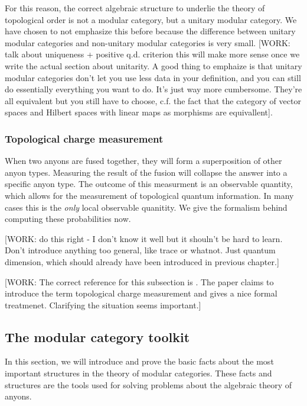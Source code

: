For this reason, the correct algebraic structure to underlie the theory of topological order is not a modular category, but a unitary modular category. We have chosen to not emphasize this before because the difference between unitary modular categories and non-unitary modular categories is very small. [WORK: talk about uniqueness + positive q.d. criterion this will make more sense once we write the actual section about unitarity. A good thing to emphaize is that unitary modular categories don't let you use less data in your definition, and you can still do essentially everything you want to do. It's just way more cumbersome. They're all equivalent but you still have to choose, c.f. the fact that the category of vector spaces and Hilbert spaces with linear maps as morphisms are equivallent].

\subsubsection{Topological charge measurement}

When two anyons are fused together, they will form a superposition of other anyon types. Measuring the result of the fusion will collapse the answer into a specific anyon type. The outcome of this measurment is an observable quantity, which allows for the measurement of topological quantum information. In many cases this is the \textit{only} local observable quanitity. We give the formalism behind computing these probabilities now.

[WORK: do this right - I don't know it well but it shouln't be hard to learn. Don't introduce anything too general, like trace or whatnot. Just quantum dimension, which should already have been introduced in previous chapter.]

[WORK: The correct reference for this subsection is \cite{bonderson2021measuring}. The paper \cite{cong2017universal} claims to introduce the term topological charge measurement and gives a nice formal treatmenet. Clarifying the situation seems important.]
 


\subsection{The modular category toolkit}

In this section, we will introduce and prove the basic facts about the most important structures in the theory of modular categories. These facts and structures are the tools used for solving problems about the algebraic theory of anyons. 

